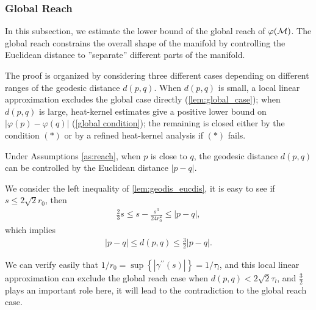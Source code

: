 \subsubsection{Global Reach}
\label{sec:glo-reach}
In this subsection, we estimate the lower bound of the global reach of $\varphi(\mathcal{M})$. The global reach constrains the overall shape of the manifold by controlling the Euclidean distance to ''separate'' different parts of the manifold.


The proof is organized by considering three different cases depending on different ranges of the geodesic distance $d(p,q)$. When $d(p,q)$ is small, a local linear approximation excludes the global case directly (\cref{lem:global_case}); when $d(p,q)$ is large, heat-kernel estimates give a positive lower bound on $|\varphi(p)-\varphi(q)|$ (\cref{global condition}); the remaining is closed either by the condition $(*)$ or by a refined heat-kernel analysis if $(*)$ fails.

Under Assumptions \ref{as:reach}, when $p$ is close to $q$, the geodesic
distance $d(p,q)$ can be controlled by the Euclidean distance $|p-q|$. 


We consider the left inequality of \cref{lem:geodis_eucdis}, it is easy to see if $s\leq 2\sqrt{2}r_0$, then
\begin{align}
	\frac{2}{3}s\leq s-\frac{s^3}{24r_0^2} \leq |p-q|,
\end{align}
which implies 
\begin{align}
	|p-q|\leq d(p,q) \leq \frac{3}{2}|p-q|.
\end{align}

We can verify easily that $1/r_0=\sup
\left\{|\gamma^{\prime\prime}(s)|\right\}=1/\tau_{l}$, and this local linear approximation can exclude the global reach case when $d(p,q)< 2\sqrt{2}\tau_{l}$, and $\frac{3}{2}$ plays an important role here, it will lead to the contradiction to the global reach case.


